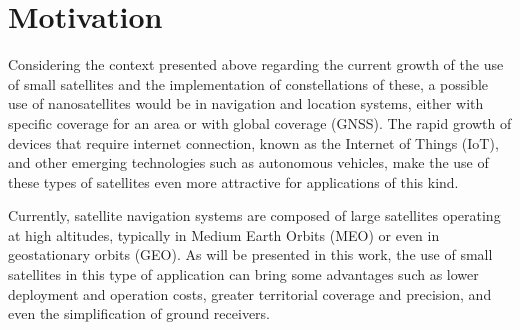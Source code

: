 \section{Motivation}




Considering the context presented above regarding the current growth of the use of small satellites and the implementation of constellations of these, a possible use of nanosatellites would be in navigation and location systems, either with specific coverage for an area or with global coverage (GNSS). The rapid growth of devices that require internet connection, known as the Internet of Things (IoT), and other emerging technologies such as autonomous vehicles, make the use of these types of satellites even more attractive for applications of this kind.

Currently, satellite navigation systems are composed of large satellites operating at high altitudes, typically in Medium Earth Orbits (MEO) or even in geostationary orbits (GEO). As will be presented in this work, the use of small satellites in this type of application can bring some advantages such as lower deployment and operation costs, greater territorial coverage and precision, and even the simplification of ground receivers.

